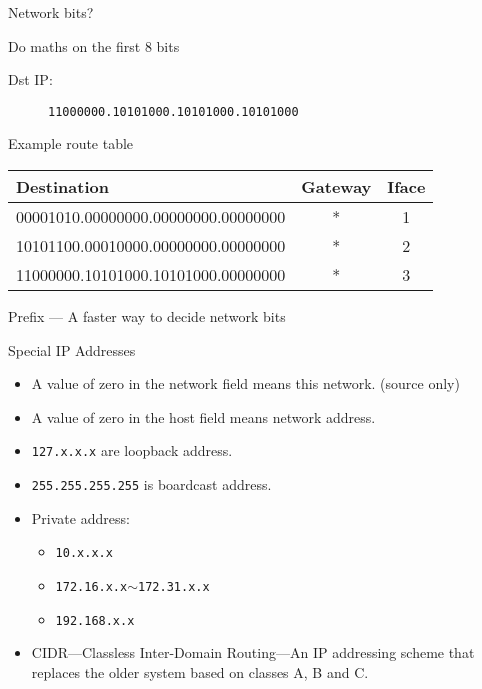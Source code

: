 \begin{frame}{Network bits?}
  \begin{iblock}{Do maths on the first 8 bits}
    \begin{description}
    \item[Dst IP:] \texttt{11000000.10101000.10101000.10101000}
    \end{description}
    
    \begin{center}
      Example route table\\
      \ttfamily
      \begin{tabular}{lcc}
        \hline
        Destination& Gateway& Iface\\\hline
        00001010.00000000.00000000.00000000& *& 1\\
        10101100.00010000.00000000.00000000& *& 2\\
        11000000.10101000.10101000.00000000& *& 3\\\hline
      \end{tabular}
    \end{center}
  \end{iblock}
      
  \begin{iblock}{Prefix --- A faster way to decide network bits}
    \centering \mode<beamer>{ \texttt{[image: prefix2]} }%
  \end{iblock}
\end{frame}

\begin{frame}{Special IP Addresses}
  \begin{itemize}
  \item A value of zero in the network field means this network. (source only)
  \item A value of zero in the host field means network address.
  \item \texttt{127.x.x.x} are loopback address.
  \item \texttt{255.255.255.255} is boardcast address.
  \item Private address:
    \begin{itemize}
    \item \texttt{10.x.x.x}
    \item \texttt{172.16.x.x}$\sim$\texttt{172.31.x.x}
    \item \texttt{192.168.x.x}
    \end{itemize}
  \item CIDR---Classless Inter-Domain Routing---An IP addressing scheme that replaces the older
    system based on classes A, B and C.
  \end{itemize}
\end{frame}

